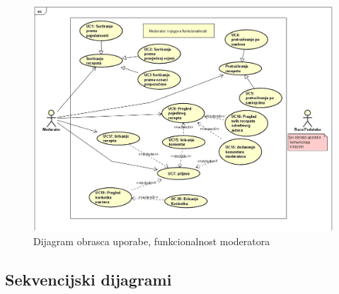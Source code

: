 \begin{figure}[H]
	\includegraphics[scale=0.8]{slike/Slika6.jpg} %
	\centering
	\caption{Dijagram obrasca uporabe, funkcionalnost moderatora}
	\label{fig:promjene}
\end{figure}

\eject

\subsection{Sekvencijski dijagrami}


